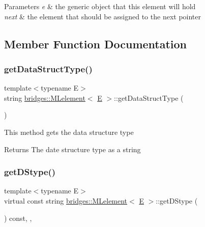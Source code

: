 \begin{DoxyParams}{Parameters}
{\em e} & the generic object that this element will hold \\
\hline
{\em next} & the element that should be assigned to the next pointer \\
\hline
\end{DoxyParams}


\subsection{Member Function Documentation}
\mbox{\label{classbridges_1_1_m_lelement_a49e5d132e80531f005e1d2da666f0c39}} 
\subsubsection{\texorpdfstring{getDataStructType()}{getDataStructType()}}
{\footnotesize\ttfamily template$<$typename E$>$ \\
string \mbox{\hyperlink{classbridges_1_1_m_lelement}{bridges\+::\+M\+Lelement}}$<$ \mbox{\hyperlink{namespacebridges_acfb0a4f7877d8f63de3e6862004c50eda3a3ea00cfc35332cedf6e5e9a32e94da}{E}} $>$\+::get\+Data\+Struct\+Type (\begin{DoxyParamCaption}{ }\end{DoxyParamCaption})\hspace{0.3cm}{\ttfamily [inline]}}

This method gets the data structure type

\begin{DoxyReturn}{Returns}
The date structure type as a string 
\end{DoxyReturn}
\mbox{\label{classbridges_1_1_m_lelement_af6e8a50c38e6481ce2c569d0174c564e}} 
\subsubsection{\texorpdfstring{getDStype()}{getDStype()}}
{\footnotesize\ttfamily template$<$typename E$>$ \\
virtual const string \mbox{\hyperlink{classbridges_1_1_m_lelement}{bridges\+::\+M\+Lelement}}$<$ \mbox{\hyperlink{namespacebridges_acfb0a4f7877d8f63de3e6862004c50eda3a3ea00cfc35332cedf6e5e9a32e94da}{E}} $>$\+::get\+D\+Stype (\begin{DoxyParamCaption}{ }\end{DoxyParamCaption}) const\hspace{0.3cm}{\ttfamily [inline]}, {\ttfamily [override]}, {\ttfamily [virtual]}}


